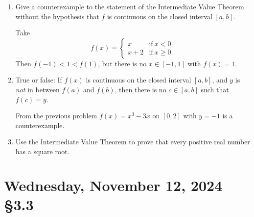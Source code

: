 \documentclass[12pt]{amsart}
\def\We{Wednesday}
\numberwithin{equation}{section}
\theoremstyle{plain} %
\newcommand{\Nov}[3]{\section{#2, November #1, 2024 \quad \S#3}}
\theoremstyle{definition}
\theoremstyle{remark}
\begin{document}
\begin{enumerate}
\item  Give a counterexample to the statement of the Intermediate Value Theorem without the hypothesis that $f$ is continuous on the closed interval $[a,b]$.

\begin{framed}
Take \[f(x) = \begin{cases} x & \text{if} \ x<0 \\ x+2 & \text{if} \ x\geq 0. \end{cases}\]
Then $f(-1) < 1 < f(1)$, but there is no $x\in [-1,1]$ with $f(x) = 1$.
\end{framed}



\item True or false: If $f(x)$ is continuous on the closed interval  $[a,b]$, and $y$ is \emph{not} in between $f(a)$ and $f(b)$, then there is no $c\in[a,b]$ such that $f(c) = y$.

\begin{framed}
From the previous problem $f(x)=x^3-3x$ on $[0,2]$ with $y=-1$ is a counterexample.
\end{framed}
\item Use the Intermediate Value Theorem to prove that every positive real number has a square root.
\end{enumerate}






	\newpage
	
\setcounter{section}{31}
	
	\Nov{12}{\We}{3.3}
	
\end{document}

